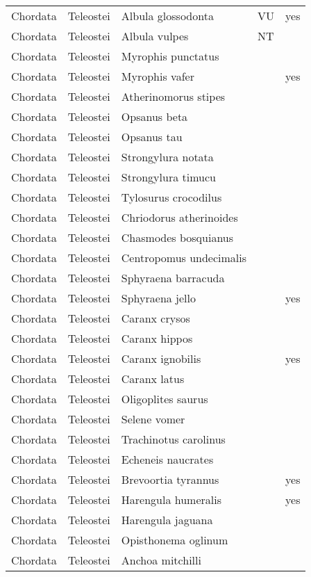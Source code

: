 \begin{longtable}{lllll}
  Chordata & Teleostei & Albula glossodonta & VU & yes \\ 
  Chordata & Teleostei & Albula vulpes & NT &  \\ 
  Chordata & Teleostei & Myrophis punctatus &  &  \\ 
  Chordata & Teleostei & Myrophis vafer &  & yes \\ 
  Chordata & Teleostei & Atherinomorus stipes &  &  \\ 
  Chordata & Teleostei & Opsanus beta &  &  \\ 
  Chordata & Teleostei & Opsanus tau &  &  \\ 
  Chordata & Teleostei & Strongylura notata &  &  \\ 
  Chordata & Teleostei & Strongylura timucu &  &  \\ 
  Chordata & Teleostei & Tylosurus crocodilus &  &  \\ 
  Chordata & Teleostei & Chriodorus atherinoides &  &  \\ 
  Chordata & Teleostei & Chasmodes bosquianus &  &  \\ 
  Chordata & Teleostei & Centropomus undecimalis &  &  \\ 
  Chordata & Teleostei & Sphyraena barracuda &  &  \\ 
  Chordata & Teleostei & Sphyraena jello &  & yes \\ 
  Chordata & Teleostei & Caranx crysos &  &  \\ 
  Chordata & Teleostei & Caranx hippos &  &  \\ 
  Chordata & Teleostei & Caranx ignobilis &  & yes \\ 
  Chordata & Teleostei & Caranx latus &  &  \\ 
  Chordata & Teleostei & Oligoplites saurus &  &  \\ 
  Chordata & Teleostei & Selene vomer &  &  \\ 
  Chordata & Teleostei & Trachinotus carolinus &  &  \\ 
  Chordata & Teleostei & Echeneis naucrates &  &  \\ 
  Chordata & Teleostei & Brevoortia tyrannus &  & yes \\ 
  Chordata & Teleostei & Harengula humeralis &  & yes \\ 
  Chordata & Teleostei & Harengula jaguana &  &  \\ 
  Chordata & Teleostei & Opisthonema oglinum &  &  \\ 
  Chordata & Teleostei & Anchoa mitchilli &  &  \\ 

\end{longtable}
